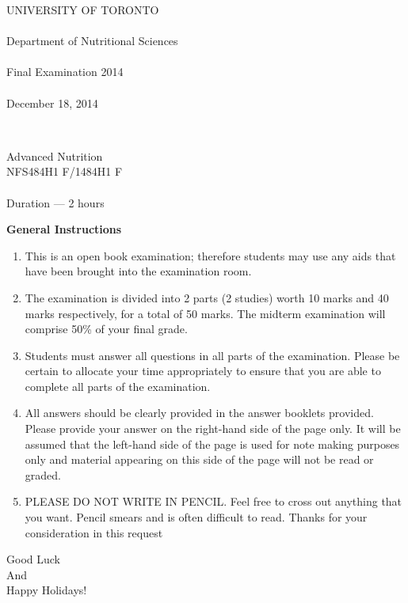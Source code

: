 
\begin{center}
\bfseries{
UNIVERSITY OF TORONTO
\\~\\
Department of Nutritional Sciences
\\~\\
Final Examination 2014
\\~\\
December 18, 2014

~~

Advanced Nutrition \\
NFS484H1 F/1484H1 F
\\~\\
Duration --- 2 hours}
\end{center}


\vspace{2.75cm}

\textbf{General Instructions}

\begin{enumerate}
    \item This is an open book examination; therefore students may use
  any aids that have been brought into the examination room.
   
    \item The examination is divided into 2 parts (2 studies) worth 10
  marks and 40 marks respectively, for a total of 50 marks.  The
  midterm examination will comprise 50\% of your final grade.

    \item Students must answer all questions in all parts of the
  examination.  Please be certain to allocate your time appropriately
  to ensure that you are able to complete all parts of the
  examination.

    \item All answers should be clearly provided in the answer booklets
  provided.  Please provide your answer on the right-hand side of the
  page only.  It will be assumed that the left-hand side of the page
  is used for note making purposes only and material appearing on this
  side of the page will not be read or graded.

    \item PLEASE DO NOT WRITE IN PENCIL.  Feel free to cross out anything
  that you want.  Pencil smears and is often difficult to read.
  Thanks for your consideration in this request
\end{enumerate}

\begin{center}
Good Luck \\ And \\ Happy Holidays!
\end{center}

\newpage\newpage

